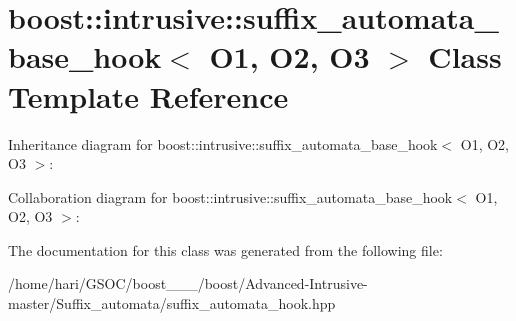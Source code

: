 \hypertarget{classboost_1_1intrusive_1_1suffix__automata__base__hook}{}\section{boost\+:\+:intrusive\+:\+:suffix\+\_\+automata\+\_\+base\+\_\+hook$<$ O1, O2, O3 $>$ Class Template Reference}
\label{classboost_1_1intrusive_1_1suffix__automata__base__hook}


Inheritance diagram for boost\+:\+:intrusive\+:\+:suffix\+\_\+automata\+\_\+base\+\_\+hook$<$ O1, O2, O3 $>$\+:


Collaboration diagram for boost\+:\+:intrusive\+:\+:suffix\+\_\+automata\+\_\+base\+\_\+hook$<$ O1, O2, O3 $>$\+:


The documentation for this class was generated from the following file\+:\begin{DoxyCompactItemize}
\item 
/home/hari/\+G\+S\+O\+C/boost\+\_\+\_\+\_/boost/\+Advanced-\/\+Intrusive-\/master/\+Suffix\+\_\+automata/suffix\+\_\+automata\+\_\+hook.\+hpp\end{DoxyCompactItemize}
